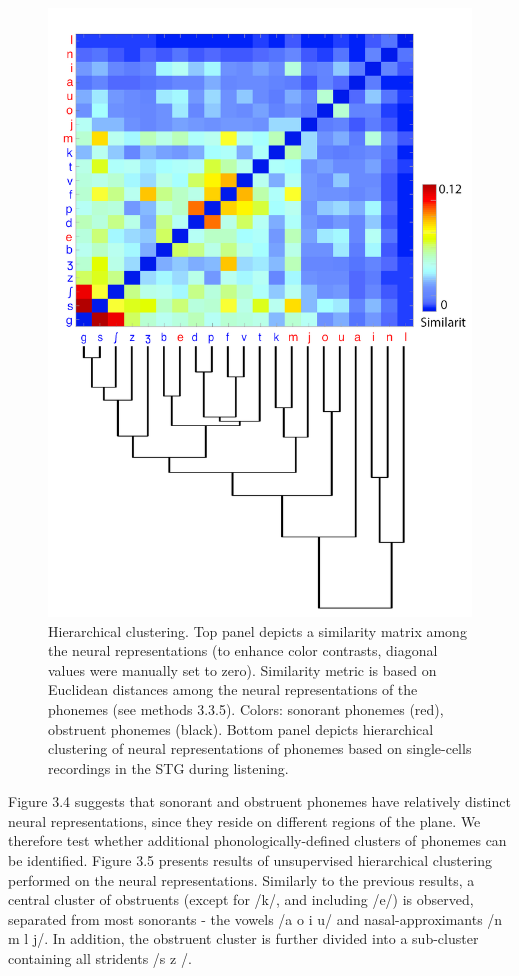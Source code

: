 \begin{figure}[H]
\vspace{.3in}
\includegraphics[width=\linewidth]{Figures/Ch3/Figure4_B.png}
\caption{Hierarchical clustering. Top panel depicts a similarity matrix among the neural representations (to enhance color contrasts, diagonal values were manually set to zero). Similarity metric is based on Euclidean distances among the neural representations of the phonemes (see methods 3.3.5). Colors: sonorant phonemes (red), obstruent phonemes (black). Bottom panel depicts hierarchical clustering of neural representations of phonemes based on single-cells recordings in the STG during listening.}
\end{figure}

Figure 3.4 suggests that sonorant and obstruent phonemes have relatively distinct neural representations, since they reside on different regions of the plane. We therefore test whether additional phonologically-defined clusters of phonemes can be identified. Figure 3.5 presents results of unsupervised hierarchical clustering performed on the neural representations. Similarly to the previous results, a central cluster of obstruents (except for /k/, and including /e/) is observed, separated from most sonorants - the vowels /a o i u/ and nasal-approximants /n m l j/. In addition, the obstruent cluster is further divided into a sub-cluster containing all stridents /s  z /. 

